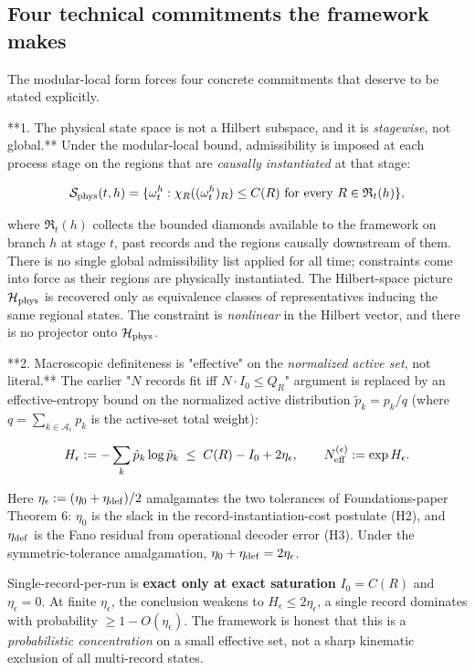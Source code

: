 \documentclass[11pt,a4paper]{article}
\begin{document}
\subsection{Four technical commitments the framework makes}

The modular-local form forces four concrete commitments that deserve to be stated explicitly.

**1. The physical state space is not a Hilbert subspace, and it is \emph{stagewise}, not global.** Under the modular-local bound, admissibility is imposed at each process stage on the regions that are \emph{causally instantiated} at that stage:

\[
\mathcal{S}_{\rm phys}(t, h) = \{ \omega_t^h : \chi_R((\omega_t^h)_R) \le C(R) \text{ for every } R \in \mathfrak{R}_t(h) \},
\]

where $\mathfrak{R}_t(h)$ collects the bounded diamonds available to the framework on branch $h$ at stage $t$, past records and the regions causally downstream of them. There is no single global admissibility list applied for all time; constraints come into force as their regions are physically instantiated. The Hilbert-space picture $\mathcal{H}_{\rm phys}$ is recovered only as equivalence classes of representatives inducing the same regional states. The constraint is \emph{nonlinear} in the Hilbert vector, and there is no projector onto $\mathcal{H}_{\rm phys}$.

**2. Macroscopic definiteness is "effective" on the \emph{normalized active set}, not literal.** The earlier "$N$ records fit iff $N \cdot I_0 \le Q_R$" argument is replaced by an effective-entropy bound on the normalized active distribution $\tilde p_k = p_k/q$ (where $q = \sum_{k \in \mathcal{A}_\epsilon} p_k$ is the active-set total weight):

\[
H_\epsilon := -\sum_k \tilde p_k \log \tilde p_k \;\le\; C(R) - I_0 + 2\eta_\epsilon, \qquad N^{(\epsilon)}_{\rm eff} := \exp H_\epsilon.
\]

Here $\eta_\epsilon := (\eta_0 + \eta_{\rm def})/2$ amalgamates the two tolerances of Foundations-paper Theorem 6: $\eta_0$ is the slack in the record-instantiation-cost postulate (H2), and $\eta_{\rm def}$ is the Fano residual from operational decoder error (H3). Under the symmetric-tolerance amalgamation, $\eta_0 + \eta_{\rm def} = 2\eta_\epsilon$.

Single-record-per-run is \textbf{exact only at exact saturation} $I_0 = C(R)$ and $\eta_\epsilon = 0$. At finite $\eta_\epsilon$, the conclusion weakens to $H_\epsilon \le 2\eta_\epsilon$, a single record dominates with probability $\ge 1 - O(\eta_\epsilon)$. The framework is honest that this is a \emph{probabilistic concentration} on a small effective set, not a sharp kinematic exclusion of all multi-record states.
\end{document}
